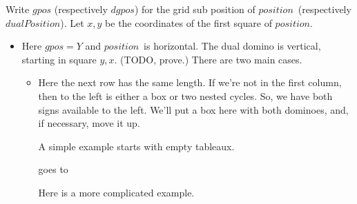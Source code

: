 \documentclass[12pt]{article}
\numberwithin{equation}{section}
\newcommand{\horizontalDominoRS}[3]{\filldraw [dominoRSStyle] (#2 - 1 + \eps, #1 - 1 + \eps) rectangle + (2 - \teps, 1 -\teps) node [dominoText] {$#3$};}
\newcommand{\verticalDominoRSShift}[4]{\filldraw [dominoRSStyle] (#2 - 1 + #4 + \eps,  #1 - 1 + \eps) rectangle + (1 - \teps,2 -\teps) node [dominoText] {$#3$};}
\newcommand{\pos}{$position$}
\newcommand{\dpos}{$dualPosition$}
\begin{document}
  Write $gpos$ (respectively $dgpos$) for the grid sub position of \pos\ (respectively \dpos).
  Let $x, y$ be the coordinates of the first square of \pos.
  \begin{itemize}
    \item Here $gpos = Y$ and \pos\ is horizontal.
    The dual domino is vertical, starting in square $y, x$. (TODO, prove.)
    There are two main cases.
    \begin{itemize}
      \item Here the next row has the same length.
      If we're not in the first column, then to the left is either a box or two nested cycles.
      So, we have both signs available to the left.
      We'll put a box here with both dominoes, and, if necessary, move it up.

      A simple example starts with empty tableaux.
      \begin{figure}[H]
        \centering
      \end{figure}
      goes to
      \begin{figure}[H]
        \centering
      \end{figure}
      \begin{figure}[H]
        \centering
      \end{figure}
      Here is a more complicated example.
      \begin{figure}[H]
        \centering
\end{figure}
\end{itemize}
\end{itemize}
\end{document}
